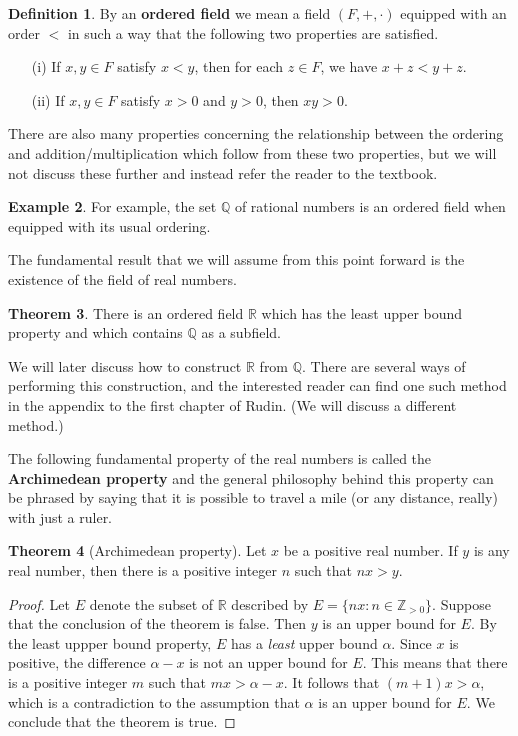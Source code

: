 \documentclass[12pt]{article}
\theoremstyle{definition}
\newtheorem{definition}{Definition}
\newtheorem{example}[definition]{Example}
\theoremstyle{theorem}
\newtheorem{theorem}[definition]{Theorem}
\begin{document}
\begin{definition}
By an \textbf{ordered field} we mean a field $(F, +, \cdot)$ equipped with an order $<$ in such a way that the following two properties are satisfied. 
\begin{enumerate}
\item[(i)] If $x,y \in F$ satisfy $x < y$, then for each $z \in F$, we have $x + z < y + z$. 
\item[(ii)] If $x,y \in F$ satisfy $x >0$ and $y > 0$, then $x y > 0$. 
\end{enumerate}
There are also many properties concerning the relationship between the ordering and addition/multiplication which follow from these two properties, but we will not discuss these further and instead refer the reader to the textbook. 
\end{definition}

\begin{example}
For example, the set $\mathbb{Q}$ of rational numbers is an ordered field when equipped with its usual ordering.
\end{example}  

The fundamental result that we will assume from this point forward is the existence of the field of real numbers. 

\begin{theorem}
There is an ordered field $\mathbb{R}$ which has the least upper bound property and which contains $\mathbb{Q}$ as a subfield. 
\end{theorem}

We will later discuss how to construct $\mathbb{R}$ from $\mathbb{Q}$. There are several ways of performing this construction, and the interested reader can find one such method in the appendix to the first chapter of Rudin. (We will discuss a different method.)

The following fundamental property of the real numbers is called the \textbf{Archimedean property} and the general philosophy behind this property can be phrased by saying that it is possible to travel a mile (or any distance, really) with just a ruler. 

\begin{theorem}[Archimedean property]
Let $x$ be a positive real number. If $y$ is any real number, then there is a positive integer $n$ such that $nx > y.$
\end{theorem}

\begin{proof}
Let $E$ denote the subset of $\mathbb{R}$ described by $E = \{nx : n \in \mathbb{Z}_{>0}\}$. Suppose that the conclusion of the theorem is false. Then $y$ is an upper bound for $E$. By the least uppper bound property, $E$ has a \emph{least} upper bound $\alpha$. Since $x$ is positive, the difference $\alpha - x$ is not an upper bound for $E$. This means that there is a positive integer $m$ such that $mx > \alpha - x$. It follows that $(m+1)x > \alpha$, which is a contradiction to the assumption that $\alpha$ is an upper bound for $E$. We conclude that the theorem is true. 
\end{proof}
\end{document}
